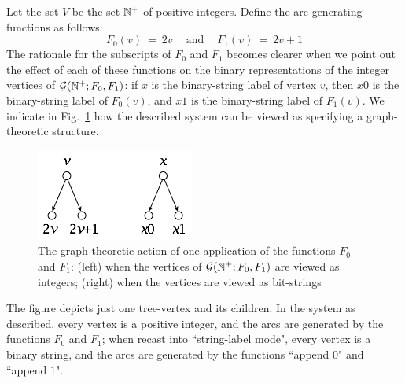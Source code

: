 Let the set $V$ be the set $\mathbb{N}^+$ of positive integers.  Define the arc-generating functions as follows:
\[ F_0(v) \ = \ 2v \ \ \ \ \mbox{ and } \ \ \ \ F_1(v) \ = \ 2v+1 \]
The rationale for the subscripts of $F_0$ and $F_1$ becomes clearer when we point out the effect of each of these functions on the binary representations of the integer vertices of
$\mbox{$\cal G$}(\mathbb{N}^+; F_0, F_1)$: if $x$ is the binary-string label of vertex $v$, then $x0$ is the binary-string label of $F_0(v)$, and $x1$ is the binary-string label of $F_1(v)$.  We indicate in Fig.~\ref{fig:one-node-tree} how the described system can be viewed as specifying a graph-theoretic structure.
\begin{figure}[hbt]
\begin{center}
       \includegraphics[scale=0.5]{FiguresGraph/codingTree1}
\caption{The graph-theoretic action of one application of the functions $F_0$ and $F_1$:
(left) when the vertices of $\mbox{$\cal G$}(\mathbb{N}^+; F_0, F_1)$ are viewed as integers; (right) when the vertices
are viewed as bit-strings}  
\label{fig:one-node-tree}
\end{center}
\end{figure}
The figure depicts just one tree-vertex and its children.  In the system as described, every vertex is a positive integer, and the arcs are generated by the functions $F_0$ and $F_1$; when recast into ``string-label mode", every vertex is a binary string, and the arcs are generated by the functions ``append $0$" and ``append $1$".

\bigskip

